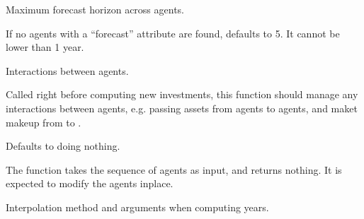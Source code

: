 \documentclass[letterpaper,10pt,english]{sphinxmanual}
\begin{document}
\begin{fulllineitems}
\begin{fulllineitems}
\label{\detokenize{api:muse.sectors.sector.Sector.forecast}}
Maximum forecast horizon across agents.

If no agents with a “forecast” attribute are found, defaults to 5. It cannot be
lower than 1 year.

\end{fulllineitems}


\begin{fulllineitems}
\label{\detokenize{api:muse.sectors.sector.Sector.interactions}}
Interactions between agents.

Called right before computing new investments, this function should manage any
interactions between agents, e.g. passing assets from  agents  to 
agents, and maket make\sphinxhyphen{}up from  to .

Defaults to doing nothing.

The function takes the sequence of agents as input, and returns nothing. It is
expected to modify the agents in\sphinxhyphen{}place.







\end{fulllineitems}


\begin{fulllineitems}
\label{\detokenize{api:muse.sectors.sector.Sector.interpolation}}
Interpolation method and arguments when computing years.

\end{fulllineitems}



\end{fulllineitems}
\end{document}
